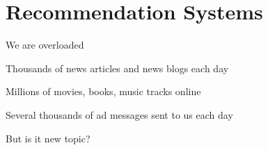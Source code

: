 	\chapter{Recommendation Systems}

	\begin{bulletedlist}
		\item We are overloaded
		\begin{bulletedlist}
			\item Thousands of news articles and news blogs each day
			\item Millions of movies, books, music tracks online
			\item Several thousands of ad messages sent to us each day
			\item But is it new topic?
		\end{bulletedlist}




\end{bulletedlist}
